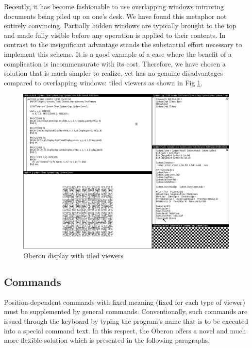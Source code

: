 Recently, it has become fashionable to use overlapping windows mirroring documents being piled
up on one's desk. We have found this metaphor not entirely convincing. Partially hidden windows
are typically brought to the top and made fully visible before any operation is applied to their
contents. In contrast to the insignificant advantage stands the substantial effort necessary to
implement this scheme. It is a good example of a case where the benefit of a complication is
incommensurate with its cost. Therefore, we have chosen a solution that is much simpler to realize,
yet has no genuine disadvantages compared to overlapping windows: tiled viewers as shown in Fig \ref{fig:viewers}.
\begin{figure}
  \centering
  \includegraphics[width=.96\textwidth]{i/1.png}
  \caption{Oberon display with tiled viewers}
  \label{fig:viewers}
\end{figure}

\subsection{Commands}
Position-dependent commands with fixed meaning (fixed for each type of viewer) must be
supplemented by general commands. Conventionally, such commands are issued through the
keyboard by typing the program's name that is to be executed into a special command text. In this
respect, the Oberon offers a novel and much more flexible solution which is presented in the following paragraphs.

